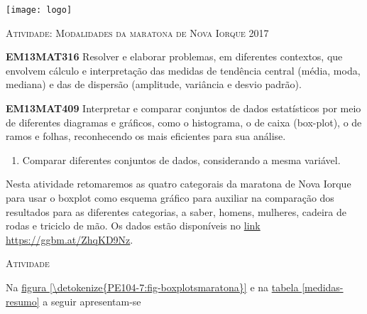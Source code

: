 \documentclass[10 pt,usenames,dvipsnames, oneside]{article}
\begin{document}
\begin{center}
  \begin{minipage}[l]{3cm}
\texttt{[image: logo]}    
\end{minipage}\hfill
\begin{minipage}[r]{.8\textwidth}
 {\Large \scshape Atividade: Modalidades da maratona de Nova Iorque 2017}  
\end{minipage}
\end{center}
\vspace{.2cm}

\ifdefined\prof
\begin{objetivos}
\item \textbf{EM13MAT316} Resolver e elaborar problemas, em diferentes contextos, que envolvem cálculo e interpretação das medidas de tendência central (média, moda, mediana) e das de dispersão (amplitude, variância e desvio padrão).
\item \textbf{EM13MAT409} Interpretar e comparar conjuntos de dados estatísticos por meio de diferentes diagramas e gráficos, como o histograma, o de caixa (box-plot), o de ramos e folhas, reconhecendo os mais eficientes para sua análise.
\end{objetivos}

\begin{goals}
\begin{enumerate}
\item Comparar diferentes conjuntos de dados, considerando a mesma variável.
\end{enumerate}

\tcblower

Nesta atividade retomaremos as quatro categorais da maratona de Nova Iorque para usar o boxplot como esquema gráfico para auxiliar na comparação dos resultados para as diferentes categorias, a saber, homens, mulheres, cadeira de rodas e triciclo de mão. Os dados estão disponíveis no \href{https://ggbm.at/ZhqKD9Nz}{link} \url{https://ggbm.at/ZhqKD9Nz}.
\end{goals}

\bigskip
\begin{center}
{\large \scshape Atividade}
\end{center}
\fi

Na \hyperref[\detokenize{PE104-7:fig-boxplotsmaratona}]{figura \ref{\detokenize{PE104-7:fig-boxplotsmaratona}}} e na \hyperref[medidas-resumo]{tabela \ref{medidas-resumo}} a seguir apresentam-se 
\end{document}
